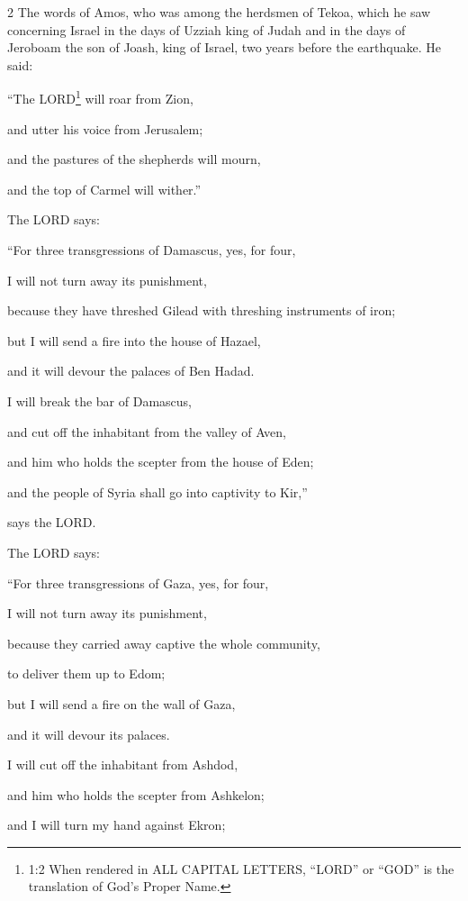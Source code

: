 \begin{multicols}{2}
	\mychapter{} \myverse*{}The words of Amos, who was among the herdsmen of Tekoa, which he
	saw concerning Israel in the days of Uzziah king of Judah and in the days of Jeroboam the son of Joash,
	king of Israel, two years before the earthquake.
	\myverse{}He said:
	
	“The LORD\footnote{1:2 When rendered in ALL CAPITAL LETTERS, “LORD” or “GOD” is the translation of God’s Proper Name.}
	will roar from Zion,
	
	and utter his voice from Jerusalem;
	
	and the pastures of the shepherds will mourn,
	
	and the top of Carmel will wither.”
	
	\myverse{}The LORD says:
	
	“For three transgressions of Damascus, yes, for four,
	
	I will not turn away its punishment,
	
	because they have threshed Gilead with threshing instruments of iron;
	
	\myverse{}but I will send a fire into the house of Hazael,
	
	and it will devour the palaces of Ben Hadad.
	
	\myverse{}I will break the bar of Damascus,
	
	and cut off the inhabitant from the valley of Aven,
	
	and him who holds the scepter from the house of Eden;
	
	and the people of Syria shall go into captivity to Kir,”
	
	says the LORD.
	
	\myverse{}The LORD says:
	
	“For three transgressions of Gaza, yes, for four,
	
	I will not turn away its punishment,
	
	because they carried away captive the whole community,
	
	to deliver them up to Edom;
	
	\myverse{}but I will send a fire on the wall of Gaza,
	
	and it will devour its palaces.
	
	\myverse{}I will cut off the inhabitant from Ashdod,
	
	and him who holds the scepter from Ashkelon;
	
	and I will turn my hand against Ekron;
	

\end{multicols}
